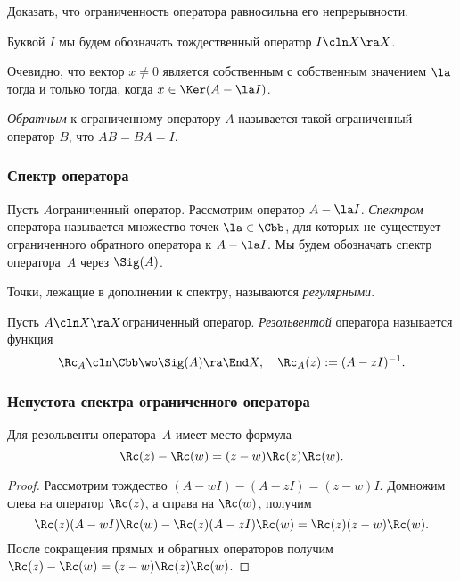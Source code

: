 \documentclass[a4paper]{article}
\begin{document}
\begin{problem}
Доказать, что ограниченность оператора равносильна его непрерывности.
\end{problem}

Буквой $I$ мы будем обозначать тождественный оператор $I\cln X \ra X$.

Очевидно, что вектор $x\neq 0$ является собственным с собственным значением $\la$ тогда и только тогда,
когда $x \in \Ker(A - \la I)$.

\begin{df}
\emph{Обратным} к ограниченному оператору $A$ называется такой
ограниченный оператор $B$, что $AB = BA = I$.
\end{df}

\subsubsection{Спектр оператора}

\begin{df}
Пусть $A$\т ограниченный оператор. Рассмотрим оператор $A - \la I$.
\emph{Спектром} оператора называется множество точек $\la \in \Cbb$, для которых не существует
ограниченного обратного оператора к $A - \la I$. Мы будем обозначать спектр оператора~$A$ через $\Sig(A)$.
\end{df}

\begin{df}
Точки, лежащие в дополнении к спектру, называются \emph{регулярными}.
\end{df}

\begin{df}
Пусть $A\cln X \ra X$\т ограниченный оператор.
\emph{Резольвентой} оператора называется функция
$$\Rc_A \cln \Cbb \wo \Sig(A) \ra \End X, \quad \Rc_A(z) := (A - z I)^{-1}.$$
\end{df}

\subsubsection{Непустота спектра ограниченного оператора}

\begin{lemma}
Для резольвенты оператора~$A$ имеет место формула
$$\Rc(z) - \Rc(w) = (z-w)\Rc(z)\Rc(w).$$
\end{lemma}
\begin{proof}
Рассмотрим тождество $(A - w I) - (A - z I) = (z-w)I$. Домножим слева на оператор $\Rc(z)$, а справа на $\Rc(w)$, получим
$$\Rc(z)(A - wI)\Rc(w) - \Rc(z)(A - zI)\Rc(w) = \Rc(z)(z-w)\Rc(w).$$
После сокращения прямых и обратных операторов получим
$\Rc(z) - \Rc(w) = (z-w)\Rc(z)\Rc(w)$.
\end{proof}
\end{document}
